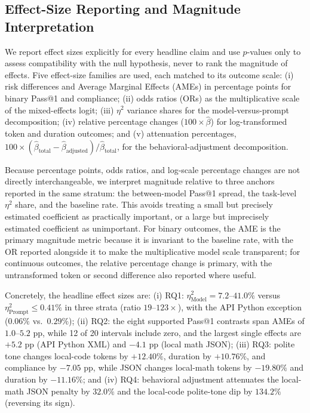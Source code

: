 \documentclass[a4paper,fleqn]{cas-sc}
\begin{document}
\subsection{Effect-Size Reporting and Magnitude Interpretation}\label{effect-size-reporting}

We report effect sizes explicitly for every headline claim and use $p$-values only to assess compatibility with the null hypothesis, never to rank the magnitude of effects. Five effect-size families are used, each matched to its outcome scale: (i) risk differences and Average Marginal Effects (AMEs) in percentage points for binary Pass@1 and compliance; (ii) odds ratios (ORs) as the multiplicative scale of the mixed-effects logit; (iii) $\eta^2$ variance shares for the model-versus-prompt decomposition; (iv) relative percentage changes ($100 \times \hat{\beta}$) for log-transformed token and duration outcomes; and (v) attenuation percentages, $100 \times (\hat{\beta}_{\text{total}} - \hat{\beta}_{\text{adjusted}}) / \hat{\beta}_{\text{total}}$, for the behavioral-adjustment decomposition.

Because percentage points, odds ratios, and log-scale percentage changes are not directly interchangeable, we interpret magnitude relative to three anchors reported in the same stratum: the between-model Pass@1 spread, the task-level $\eta^2$ share, and the baseline rate. This avoids treating a small but precisely estimated coefficient as practically important, or a large but imprecisely estimated coefficient as unimportant. For binary outcomes, the AME is the primary magnitude metric because it is invariant to the baseline rate, with the OR reported alongside it to make the multiplicative model scale transparent; for continuous outcomes, the relative percentage change is primary, with the untransformed token or second difference also reported where useful.

Concretely, the headline effect sizes are: (i) RQ1: $\eta^2_{\text{Model}} = 7.2$--$41.0\%$ versus $\eta^2_{\text{Prompt}} \le 0.41\%$ in three strata (ratio $19$--$123\times$), with the API Python exception ($0.06\%$ vs.\ $0.29\%$); (ii) RQ2: the eight supported Pass@1 contrasts span AMEs of $1.0$--$5.2$ pp, while 12 of 20 intervals include zero, and the largest single effects are $+5.2$ pp (API Python XML) and $-4.1$ pp (local math JSON); (iii) RQ3: polite tone changes local-code tokens by $+12.40\%$, duration by $+10.76\%$, and compliance by $-7.05$ pp, while JSON changes local-math tokens by $-19.80\%$ and duration by $-11.16\%$; and (iv) RQ4: behavioral adjustment attenuates the local-math JSON penalty by $32.0\%$ and the local-code polite-tone dip by $134.2\%$ (reversing its sign).
\end{document}
